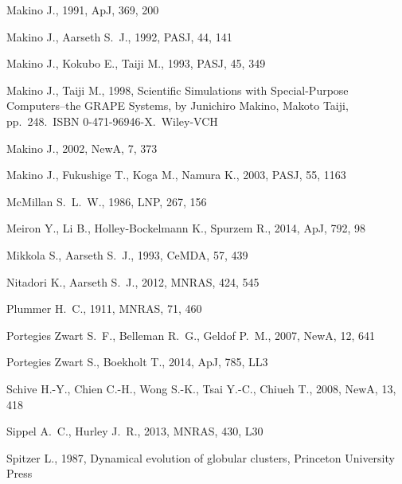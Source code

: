 \documentclass[usenatbib,aas_macros]{mn2e}
\begin{document}
\begin{thebibliography}{999}
 Makino 
J., 1991, ApJ, 369, 200 

 Makino J., Aarseth S.~J., 1992, PASJ, 44, 141 

 Makino J., Kokubo E., Taiji M., 1993, PASJ, 45, 349 

 Makino J., Taiji M., 1998, Scientific Simulations with Special-Purpose Computers--the GRAPE Systems, by Junichiro Makino, 
Makoto Taiji, pp.~248.~ISBN 0-471-96946-X.~Wiley-VCH

 Makino 
J., 2002, NewA, 7, 373 

Makino J., Fukushige T., Koga M., Namura K., 2003, PASJ, 55, 1163 

McMillan S.~L.~W., 1986, LNP, 267, 156 

Meiron Y., Li B., Holley-Bockelmann K., Spurzem R., 2014, ApJ, 792, 98 

 Mikkola S., Aarseth S.~J., 1993, CeMDA, 57, 439 

 Nitadori K., Aarseth S.~J., 2012, MNRAS, 424, 545 

Plummer H.~C., 1911, MNRAS, 71, 460 

 Portegies Zwart S.~F., Belleman R.~G., Geldof P.~M., 2007, NewA, 12, 641 

 Portegies Zwart S., Boekholt T., 2014, ApJ, 785, LL3 

Schive H.-Y., Chien C.-H., Wong S.-K., Tsai Y.-C., Chiueh T., 2008, NewA, 
13, 418 

 Sippel A.~C., Hurley J.~R., 2013, MNRAS, 430, L30 

Spitzer L., 1987, Dynamical evolution of globular clusters, Princeton University Press



\end{thebibliography}
\end{document}
